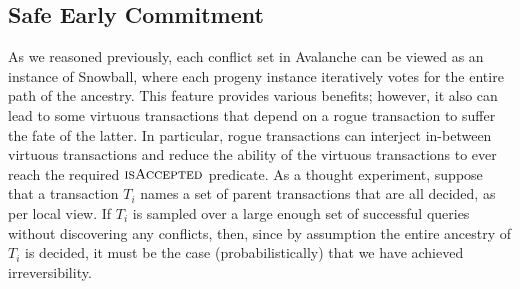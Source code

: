 \documentclass[letterpaper,twocolumn,10pt]{article}
\theoremstyle{definition}
\begin{document}
\begin{appendices}
\subsection{Safe Early Commitment}
As we reasoned previously, each conflict set in Avalanche can be viewed as an instance of Snowball, where each progeny instance iteratively votes for the entire path of the ancestry.
This feature provides various benefits; however, it also can lead to some virtuous transactions that depend on a rogue transaction to suffer the fate of the latter.
In particular, rogue transactions can interject in-between virtuous transactions and reduce the ability of the virtuous transactions to ever reach the required $\textsc{isAccepted}$ predicate.
As a thought experiment, suppose that a transaction $T_i$ names a set of parent transactions that are all decided, as per local view.
If $T_i$ is sampled over a large enough set of successful queries without discovering any conflicts, then, since by assumption the entire ancestry of $T_i$ is decided, it must be the case (probabilistically) that we have achieved irreversibility.


\end{appendices}
\end{document}

